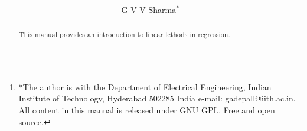 \documentclass[journal,12pt,twocolumn]{IEEEtran}
\renewcommand\thesection{\arabic{section}}
\begin{document}
\let\StandardTheFigure\thefigure
\renewcommand{\thefigure}{\thesection}



\makeatletter
{}
\makeatother

\let\StandardTheFigure\thefigure
\let\StandardTheTable\thetable
\let\vec\mathbf





\def\putbox#1#2#3{\makebox[0in][l]{\makebox[#1][l]{}\raisebox{\baselineskip}[0in][0in]{\raisebox{#2}[0in][0in]{#3}}}}
     \def\rightbox#1{\makebox[0in][r]{#1}}
     \def\centbox#1{\makebox[0in]{#1}}
     \def\topbox#1{\raisebox{-\baselineskip}[0in][0in]{#1}}
     \def\midbox#1{\raisebox{-0.5\baselineskip}[0in][0in]{#1}}

\vspace{3cm}



\title{ 
}

\author{ G V V Sharma$^{*}$%
	\thanks{*The author is with the Department
		of Electrical Engineering, Indian Institute of Technology, Hyderabad
		502285 India e-mail:  gadepall@iith.ac.in. All content in this manual is released under GNU GPL.  Free and open source.}
	
}	

\maketitle

\tableofcontents

\bigskip

\renewcommand{\thefigure}{\theenumi}
\renewcommand{\thetable}{\theenumi}


\begin{abstract}
	
This manual provides an introduction to linear lethods in regression.
\end{abstract}
\end{document}
